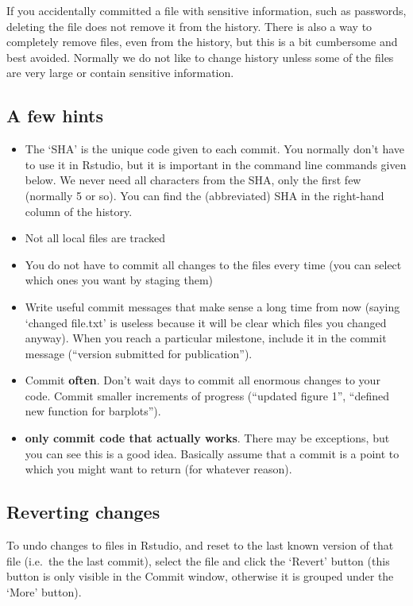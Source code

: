 \documentclass[]{book}
\providecommand{\tightlist}{%
  \setlength{\itemsep}{0pt}\setlength{\parskip}{0pt}}
\begin{document}
If you accidentally committed a file with sensitive information, such as passwords, deleting the file does not remove it from the history. There is also a way to completely remove files, even from the history, but this is a bit cumbersome and best avoided. Normally we do not like to change history unless some of the files are very large or contain sensitive information.

\hypertarget{a-few-hints}{%
\subsection{A few hints}\label{a-few-hints}}

\begin{itemize}
\tightlist
\item
  The `SHA' is the unique code given to each commit. You normally don't have to use it in Rstudio, but it is important in the command line commands given below. We never need all characters from the SHA, only the first few (normally 5 or so). You can find the (abbreviated) SHA in the right-hand column of the history.
\item
  Not all local files are tracked
\item
  You do not have to commit all changes to the files every time (you can select which ones you want by staging them)
\item
  Write useful commit messages that make sense a long time from now (saying `changed file.txt' is useless because it will be clear which files you changed anyway). When you reach a particular milestone, include it in the commit message (``version submitted for publication'').
\item
  Commit \textbf{often}. Don't wait days to commit all enormous changes to your code. Commit smaller increments of progress (``updated figure 1'', ``defined new function for barplots'').
\item
  \textbf{only commit code that actually works}. There may be exceptions, but you can see this is a good idea. Basically assume that a commit is a point to which you might want to return (for whatever reason).
\end{itemize}

\hypertarget{reverting-changes}{%
\subsection{Reverting changes}\label{reverting-changes}}

To undo changes to files in Rstudio, and reset to the last known version of that file (i.e.~the the last commit), select the file and click the `Revert' button (this button is only visible in the Commit window, otherwise it is grouped under the `More' button).
\end{document}
